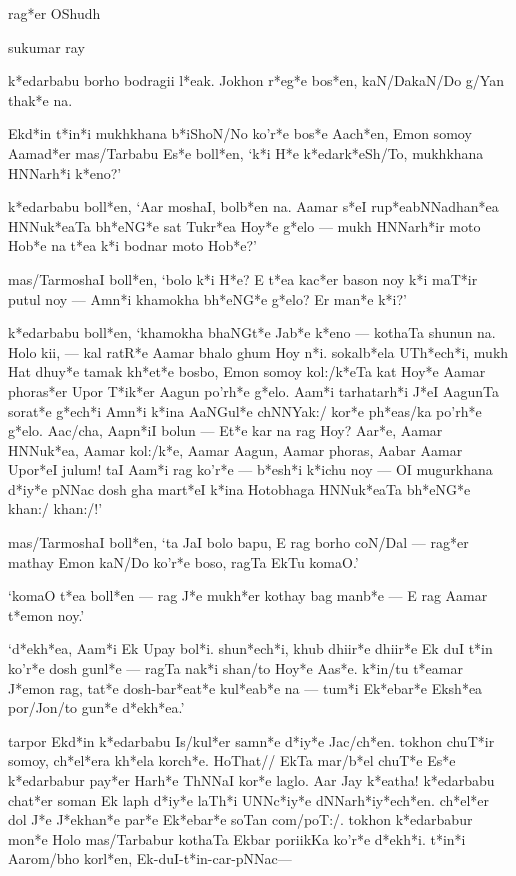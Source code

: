 


\bngxii 
\baselineskip=5.6mm

\centerline{\bngxxv ra\*g*er OShudh}
\centerline{\bngxviii sukumar ray}
\bigskip

\*k*edarbabu borho bodragii \*l*eak. Jokhon \*r*e\*g*e bo\*s*en,
kaN/DakaN/Do g/Yan tha\*k*e na. 

Ek\*d*in \*t*i\*n*i mukhkhana \*b*iShoN/No ko'\*r*e bo\*s*e Aa\*ch*en,
Emon somoy Aama\*d*er mas/Tarbabu E\*s*e bol\*l*en, `\*k*i \*H*e
\*k*edar\*k*eSh/To, mukhkhana HNNa\*rh*i \*k*eno?'

\*k*edarbabu bol\*l*en, `Aar moshaI, bol\*b*en na. Aamar \*s*eI
ru\*p*eabNNadha\*n*ea HNNu\*k*eaTa \*bh*e\*NG*e sat Tuk\*r*ea Ho\*y*e
\*g*elo --- mukh HNNa\*rh*ir moto Ho\*b*e na \*t*ea \*k*i bodnar moto
Ho\*b*e?' 

mas/TarmoshaI bol\*l*en, `bolo \*k*i \*H*e? E \*t*ea ka\*c*er bason
noy \*k*i ma\*T*ir putul noy --- Am\*n*i khamokha \*bh*e\*NG*e
\*g*elo? Er ma\*n*e \*k*i?'

\*k*edarbabu bol\*l*en, `khamokha bhaNG\*t*e Ja\*b*e \*k*eno ---
kothaTa shunun na. Holo kii, --- kal ra\*tR*e Aamar bhalo ghum Hoy
\*n*i. sokal\*b*ela U\*Th*e\*ch*i, mukh Hat dhu\*y*e tamak \*kh*e\*t*e
bosbo, Emon somoy kol:/\*k*eTa kat Ho\*y*e Aamar phora\*s*er Upor
\*T*i\*k*er Aagun po'\*rh*e \*g*elo. Aa\*m*i tarhata\*rh*i \*J*eI
AagunTa sora\*t*e \*g*e\*ch*i Am\*n*i \*k*ina AaNGu\*l*e chNNYak:/
ko\*r*e \*ph*eas/ka po'\*rh*e \*g*elo. Aac/cha, Aap\*n*iI bolun ---
E\*t*e kar na rag Hoy? Aa\*r*e, Aamar HNNu\*k*ea, Aamar kol:/\*k*e,
Aamar Aagun, Aamar phoras, Aabar Aamar Upo\*r*eI julum! taI Aa\*m*i
rag ko'\*r*e --- \*b*e\*sh*i \*k*ichu noy --- OI mugurkhana \*d*i\*y*e
pNNac dosh gha mar\*t*eI \*k*ina Hotobhaga HNNu\*k*eaTa \*bh*e\*NG*e
khan:/ khan:/!'

mas/TarmoshaI bol\*l*en, `ta JaI bolo bapu, E rag borho coN/Dal ---
ra\*g*er mathay Emon kaN/Do ko'\*r*e boso, ragTa EkTu komaO.'

`komaO \*t*ea bol\*l*en --- rag \*J*e mu\*kh*er kothay bag man\*b*e
--- E rag Aamar \*t*emon noy.'

`\*d*e\*kh*ea, Aa\*m*i Ek Upay bo\*l*i. shu\*n*e\*ch*i, khub dhii\*r*e
dhii\*r*e Ek duI \*t*in ko'\*r*e dosh gun\*l*e --- ragTa na\*k*i
shan/to Ho\*y*e Aa\*s*e. \*k*in/tu \*t*eamar \*J*emon rag, ta\*t*e
dosh-ba\*r*ea\*t*e ku\*l*ea\*b*e na --- tu\*m*i E\*k*eba\*r*e
Ek\*sh*ea por/Jon/to gu\*n*e \*d*e\*kh*ea.'

tarpor Ek\*d*in \*k*edarbabu Is/ku\*l*er sam\*n*e \*d*i\*y*e
Ja\*c/ch*en. tokhon chu\*T*ir somoy, \*ch*e\*l*era \*kh*ela
kor\*ch*e. HoThat// EkTa ma\*r/b*el chu\*T*e E\*s*e \*k*edarbabur
pa\*y*er Ha\*rh*e ThNNaI ko\*r*e laglo. Aar Jay \*k*eatha!
\*k*edarbabu cha\*t*er soman Ek laph \*d*i\*y*e la\*Th*i UNN\*c*i\*y*e
dNNa\*rh*i\*y*e\*ch*en. \*ch*e\*l*er dol \*J*e \*J*ekha\*n*e pa\*r*e
E\*k*eba\*r*e soTan com/poT:/. tokhon \*k*edarbabur mo\*n*e Holo
mas/Tarbabur kothaTa Ekbar poriikKa ko'\*r*e \*d*e\*kh*i. \*t*i\*n*i
Aarom/bho kor\*l*en, Ek-duI-\*t*in-car-pNNac---

